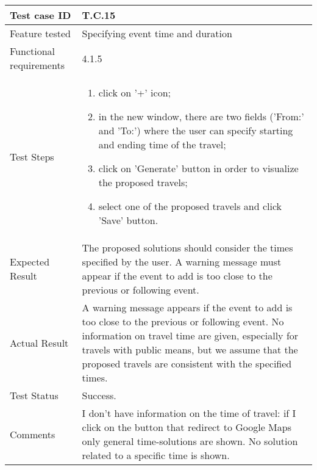 \begin{table}[H]
	\begin{center}
		\begin{tabular}{ | p{} | p{} | }
		\hline
		Test case ID & T.C.15\\
		\hline
		Feature tested & Specifying event time and duration\\
		\hline
		Functional requirements & 4.1.5 \\
    	\hline
		Test Steps & 
			\begin{enumerate}
				\item click on '+' icon;
				\item in the new window, there are two fields ('From:' and 'To:') where the user can specify starting and ending time of the travel;
				\item click on 'Generate' button in order to visualize the proposed travels;
				\item select one of the proposed travels and click 'Save' button. 
			\end{enumerate} \\
		\hline
		Expected Result & The proposed solutions should consider the times specified by the user. A warning message must appear if the event to add is too close to the previous or following event.\\
		\hline
		Actual Result & A warning message appears if the event to add is too close to the previous or following event. No information on travel time are given, especially for travels with public means, but we assume that the proposed travels are consistent with the specified times.\\ 
		\hline
		Test Status & \color{ForestGreen}Success.\\ 
		\hline
		Comments & I don't have information on the time of travel: if I click on the button that redirect to Google Maps only general time-solutions are shown. No solution related to a specific time is shown. \\ 
		\hline
		
		\end{tabular}
	\end{center}
\end{table}

